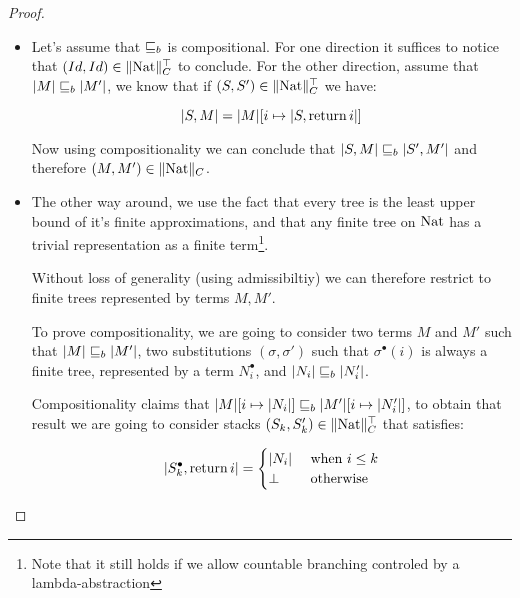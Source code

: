 \begin{ensps}
\begin{proof}
    \begin{itemize}
        \item Let's assume that $\sqsubseteq_b$ is compositional. For 
            one direction it suffices to notice that
            $(Id,Id) \in \| \textnormal{Nat} \|_C^\top$ to conclude. For the other 
            direction, assume that $|M| \sqsubseteq_b |M'|$, 
            we know that if $(S,S') \in \| \textnormal{Nat} \|_C^\top$ we have:

            \begin{equation*}
                |S,M| = |M|[i \mapsto |S, \operatorname{return} i|]
            \end{equation*}

            Now using compositionality we can conclude that $|S,M| \sqsubseteq_b
            |S',M'|$ and therefore $(M,M') \in \| \textnormal{Nat} \|_C$.

        \item The other way around, we use the fact that 
            every tree is the least upper bound of it's finite approximations,
            and that any finite tree on $\textnormal{Nat}$ has a trivial representation as a 
            finite term\footnote{Note that it still holds if 
            we allow countable branching controled by a lambda-abstraction}.
            
            Without loss of generality (using admissibiltiy) we can 
            therefore restrict to finite trees represented by terms 
            $M,M'$.

            To prove compositionality, we are going to consider 
            two terms $M$ and $M'$ such that $|M| \sqsubseteq_b |M'|$, two substitutions 
            $(\sigma,\sigma')$ such that $\sigma^\bullet (i)$ is always 
            a finite tree, represented by a term $N_i^\bullet$, and 
            $|N_i| \sqsubseteq_b |N_i'|$.

            Compositionality claims that $|M|[ i \mapsto |N_i|] \sqsubseteq_b |M'|[ i
            \mapsto |N_i'|]$, to obtain that result we are going to consider 
            stacks $(S_k,S_k') \in \| \textnormal{Nat} \|_C^\top$ that satisfies:

            \begin{equation*}
                | S_k^\bullet, \operatorname{return} i | = 
                \begin{cases}
                    |N_i| & \text{ when } i \leq k \\
                    \bot  & \text{ otherwise } 
                \end{cases}
            \end{equation*}


\end{itemize}
\end{proof}
\end{ensps}
